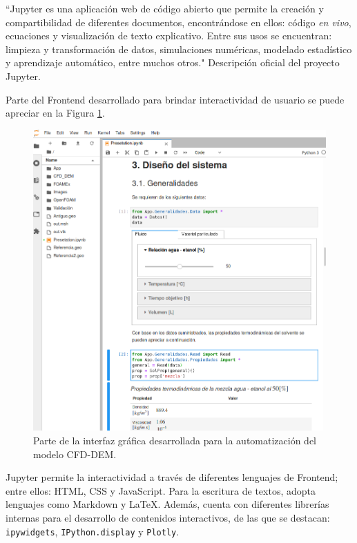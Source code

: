 \noindent
\justify

``Jupyter es una aplicaci\'on web de c\'odigo abierto que permite la creaci\'on y compartibilidad de diferentes documentos, encontr\'andose en ellos: c\'odigo \textit{en vivo}, ecuaciones y visualizaci\'on de texto explicativo. Entre sus usos se encuentran: limpieza y transformaci\'on de datos, simulaciones num\'ericas, modelado estad\'istico y aprendizaje autom\'atico, entre muchos otros." Descripci\'on oficial del proyecto Jupyter.

\noindent
\justify

Parte del Frontend desarrollado para brindar interactividad de usuario se puede apreciar en la Figura \ref{interfaz}.

\begin{figure}[h!]
	\centering
	\includegraphics[width=\textwidth]{Images/interfaz.png}
	\caption{Parte de la interfaz gr\'afica desarrollada para la automatizaci\'on del modelo CFD-DEM.}
	\label{interfaz}
\end{figure}

\noindent
\justify


Jupyter permite la interactividad a trav\'es de diferentes lenguajes de Frontend; entre ellos: HTML, CSS y JavaScript. Para la escritura de textos, adopta lenguajes como Markdown y \LaTeX. Adem\'as, cuenta con diferentes librer\'ias internas para el desarrollo de contenidos interactivos, de las que se destacan: \texttt{ipywidgets}, \texttt{IPython.display} y \texttt{Plotly}. 

